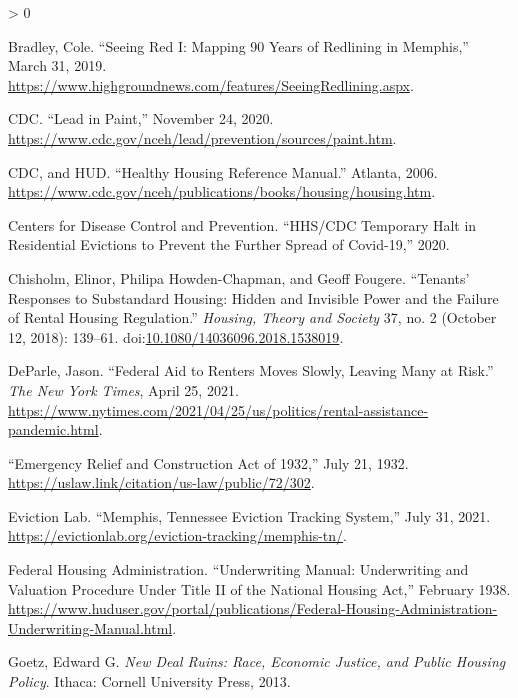 \documentclass[
  openany]{book}
\newlength{\cslhangindent}
\newenvironment{CSLReferences}[2] %
 {%
  \setlength{\parindent}{0pt}
  \ifodd #1 \everypar{\setlength{\hangindent}{\cslhangindent}}\ignorespaces\fi
  \ifnum #2 > 0
  \setlength{\parskip}{#2\baselineskip}
  \fi
 }%
 {}
\begin{document}
\begin{CSLReferences}{1}{0}
\leavevmode\hypertarget{ref-bradley2019}{}%
Bradley, Cole. {``Seeing Red I: Mapping 90 Years of Redlining in Memphis,''} March 31, 2019. \url{https://www.highgroundnews.com/features/SeeingRedlining.aspx}.

\leavevmode\hypertarget{ref-cdc2020}{}%
CDC. {``Lead in Paint,''} November 24, 2020. \url{https://www.cdc.gov/nceh/lead/prevention/sources/paint.htm}.

\leavevmode\hypertarget{ref-cdc2006}{}%
CDC, and HUD. {``Healthy Housing Reference Manual.''} Atlanta, 2006. \url{https://www.cdc.gov/nceh/publications/books/housing/housing.htm}.

\leavevmode\hypertarget{ref-cdc2020a}{}%
Centers for Disease Control and Prevention. {``HHS/CDC Temporary Halt in Residential Evictions to Prevent the Further Spread of Covid-19,''} 2020.

\leavevmode\hypertarget{ref-chisholm2018}{}%
Chisholm, Elinor, Philipa Howden-Chapman, and Geoff Fougere. {``Tenants{'} Responses to Substandard Housing: Hidden and Invisible Power and the Failure of Rental Housing Regulation.''} \emph{Housing, Theory and Society} 37, no. 2 (October 12, 2018): 139--61. doi:\href{https://doi.org/10.1080/14036096.2018.1538019}{10.1080/14036096.2018.1538019}.

\leavevmode\hypertarget{ref-deparle2021}{}%
DeParle, Jason. {``Federal Aid to Renters Moves Slowly, Leaving Many at Risk.''} \emph{The New York Times}, April 25, 2021. \url{https://www.nytimes.com/2021/04/25/us/politics/rental-assistance-pandemic.html}.

\leavevmode\hypertarget{ref-emergenc1932}{}%
{``Emergency Relief and Construction Act of 1932,''} July 21, 1932. \url{https://uslaw.link/citation/us-law/public/72/302}.

\leavevmode\hypertarget{ref-evictionlab2021}{}%
Eviction Lab. {``Memphis, Tennessee \textbar{} Eviction Tracking System,''} July 31, 2021. \url{https://evictionlab.org/eviction-tracking/memphis-tn/}.

\leavevmode\hypertarget{ref-federalhousingadministration1938}{}%
Federal Housing Administration. {``Underwriting Manual: Underwriting and Valuation Procedure Under Title II of the National Housing Act,''} February 1938. \url{https://www.huduser.gov/portal/publications/Federal-Housing-Administration-Underwriting-Manual.html}.

\leavevmode\hypertarget{ref-goetz2013}{}%
Goetz, Edward G. \emph{New Deal Ruins: Race, Economic Justice, and Public Housing Policy}. Ithaca: Cornell University Press, 2013.


\end{CSLReferences}
\end{document}
